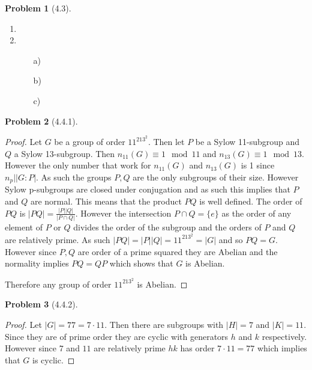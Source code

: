 \documentclass[10pt]{article}
\newcommand{\sk}{\vskip 10mm}
\theoremstyle{plain}
\newtheorem{problem}{Problem}
\theoremstyle{remark}
\begin{document}
\sk

\begin{problem}[4.3]
  
\end{problem}

\begin{enumerate}
\item
\item
  \begin{itemize}
  \item[a)]
  \item[b)]
  \item[c)]
  \end{itemize}
\end{enumerate}

\sk

\begin{problem}[4.4.1]
  
\end{problem}

\begin{proof}
  Let $G$ be a group of order $11^213^2$. Then let $P$ be a Sylow 11-subgroup
  and $Q$ a Sylow 13-subgroup. Then $n_{11}(G)\equiv 1\mod 11$ and $n_{13}(G)\equiv 1\mod 13$.
  However the only number that work for $n_{11}(G)$ and $n_{13}(G)$ is 1 since
  $n_p\bigr| |G:P|$. As such
  the groups $P,Q$ are the only subgroups of their size. However Sylow p-subgroups
  are closed under conjugation and as such this implies that $P$ and $Q$ are normal.
  This means that the product $PQ$ is well defined. The order of $PQ$ is
  $|PQ|=\frac{|P||Q|}{|P\cap Q|}$. However the intersection $P\cap Q=\{e\}$ as the order
  of any element of $P$ or $Q$ divides the order of the subgroup and the orders of
  $P$ and $Q$ are relatively prime. As such $|PQ|=|P||Q|=11^213^2=|G|$ and so
  $PQ=G$. However since $P,Q$ are order of a prime squared they are Abelian
  and the normality implies $PQ=QP$ which shows that $G$ is Abelian.

  Therefore any group of order $11^213^2$ is Abelian.
\end{proof}

\sk

\begin{problem}[4.4.2]
  
\end{problem}

\begin{proof}
  Let $|G|=77=7\cdot 11$. Then there are subgroups with $|H|=7$  and
  $|K|=11$. Since they are of prime order they are cyclic with
  generators $h$ and $k$ respectively. However since $7$ and $11$
  are relatively prime $hk$ has order $7\cdot 11=77$ which implies that
  $G$ is cyclic.
\end{proof}
\end{document}
